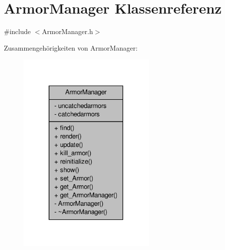 \hypertarget{class_armor_manager}{\section{Armor\-Manager Klassenreferenz}
\label{class_armor_manager}
}


{\ttfamily \#include $<$Armor\-Manager.\-h$>$}



Zusammengehörigkeiten von Armor\-Manager\-:
\nopagebreak
\begin{figure}[H]
\begin{center}
\leavevmode
\includegraphics[width=194pt]{class_armor_manager__coll__graph}
\end{center}
\end{figure}
